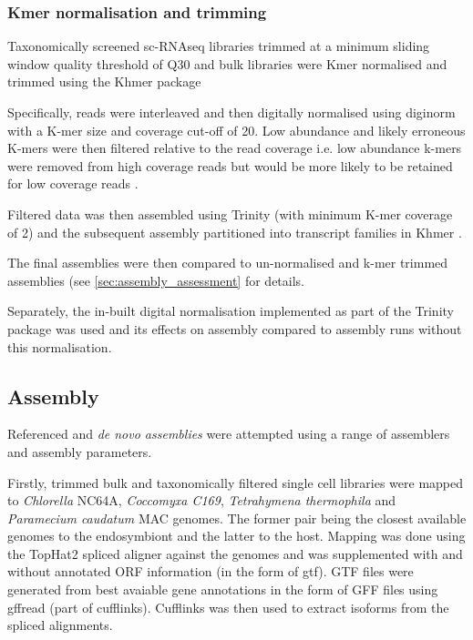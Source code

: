\subsubsection{Kmer normalisation and trimming}

Taxonomically screened sc-RNAseq libraries trimmed at a minimum sliding window quality
threshold of Q30 and bulk libraries were Kmer normalised and trimmed using the Khmer package \citep{Crusoe2015}

Specifically, reads were interleaved \citep{Doring2008} and then digitally normalised using diginorm \citep{Brown2012}
with a K-mer size and coverage cut-off of 20.  Low abundance and likely erroneous
K-mers were then filtered relative to the read coverage i.e. low abundance k-mers were removed
from high coverage reads but would be more likely to be retained for low coverage reads \citep{Zhang2015,Zhang2014}.  

Filtered data was then assembled using Trinity (with minimum K-mer coverage of 2) 
and the subsequent assembly partitioned into transcript families in Khmer \citep{Pell2012}.

The final assemblies were then compared to un-normalised and k-mer trimmed assemblies 
(see \cref{sec:assembly_assessment} for details.

Separately, the in-built digital normalisation implemented as part of the Trinity package
was used and its effects on assembly compared to assembly runs without this normalisation.


\subsection{Assembly}

Referenced and \textit{de novo assemblies} were attempted using a range of assemblers
and assembly parameters.

Firstly, trimmed bulk and taxonomically filtered single cell libraries
were mapped to \textit{Chlorella} NC64A, \textit{Coccomyxa C169}, 
\textit{Tetrahymena thermophila} and \textit{Paramecium caudatum} MAC genomes.
The former pair being the closest available genomes to the endosymbiont and the latter to the host.
Mapping was done using the TopHat2 spliced aligner \citep{Kim2013} against
the genomes and was supplemented with and without annotated ORF information (in the form of gtf).
GTF files were generated from best avaiable gene annotations in the form of GFF files using gffread (part of
cufflinks).
Cufflinks \citep{Trapnell2011} was then used to extract isoforms from the spliced alignments.

